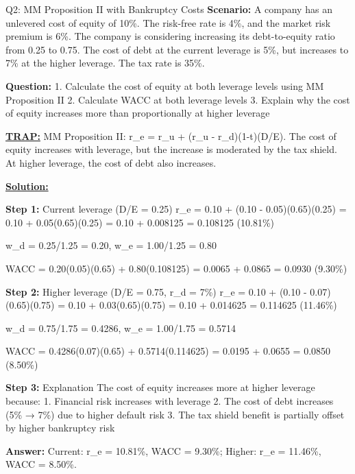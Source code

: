 \documentclass{beamer}
\renewcommand{\scriptsize}{\fontsize{6pt}{7pt}\selectfont}
\begin{document}
	\begin{frame}{Q2: MM Proposition II with Bankruptcy Costs}
		\scriptsize
		\textbf{Scenario:} A company has an unlevered cost of equity of 10\%. The risk-free rate is 4\%, and the market risk premium is 6\%. The company is considering increasing its debt-to-equity ratio from 0.25 to 0.75. The cost of debt at the current leverage is 5\%, but increases to 7\% at the higher leverage. The tax rate is 35\%.
		
		\textbf{Question:}
		1. Calculate the cost of equity at both leverage levels using MM Proposition II
		2. Calculate WACC at both leverage levels
		3. Explain why the cost of equity increases more than proportionally at higher leverage
		
		\vspace{2pt}
		\underline{\textbf{TRAP:}} MM Proposition II: r\_e = r\_u + (r\_u - r\_d)(1-t)(D/E). The cost of equity increases with leverage, but the increase is moderated by the tax shield. At higher leverage, the cost of debt also increases.
		
		\vspace{4pt}
		\underline{\textbf{Solution:}}
		
		\textbf{Step 1:} Current leverage (D/E = 0.25)
		r\_e = 0.10 + (0.10 - 0.05)(0.65)(0.25) = 0.10 + 0.05(0.65)(0.25) = 0.10 + 0.008125 = 0.108125 (10.81\%)
		
		w\_d = 0.25/1.25 = 0.20, w\_e = 1.00/1.25 = 0.80
		
		WACC = 0.20(0.05)(0.65) + 0.80(0.108125) = 0.0065 + 0.0865 = 0.0930 (9.30\%)
		
		\textbf{Step 2:} Higher leverage (D/E = 0.75, r\_d = 7\%)
		r\_e = 0.10 + (0.10 - 0.07)(0.65)(0.75) = 0.10 + 0.03(0.65)(0.75) = 0.10 + 0.014625 = 0.114625 (11.46\%)
		
		w\_d = 0.75/1.75 = 0.4286, w\_e = 1.00/1.75 = 0.5714
		
		WACC = 0.4286(0.07)(0.65) + 0.5714(0.114625) = 0.0195 + 0.0655 = 0.0850 (8.50\%)
		
		\textbf{Step 3:} Explanation
		The cost of equity increases more at higher leverage because:
		1. Financial risk increases with leverage
		2. The cost of debt increases (5\% → 7\%) due to higher default risk
		3. The tax shield benefit is partially offset by higher bankruptcy risk
		
		\textbf{Answer:} Current: r\_e = 10.81\%, WACC = 9.30\%; Higher: r\_e = 11.46\%, WACC = 8.50\%.
	\end{frame}
	
\end{document}
